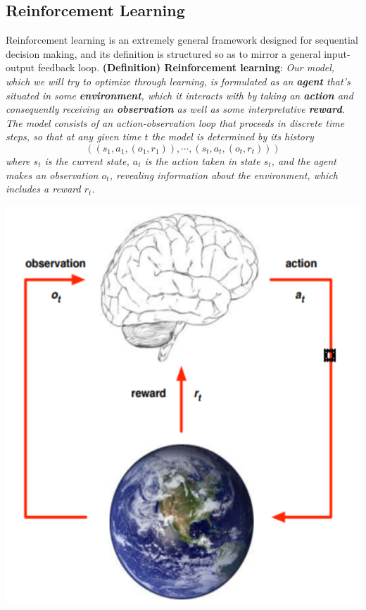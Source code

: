 \documentclass{article}
\begin{document}
\subsection{Reinforcement Learning}
Reinforcement learning is an extremely general framework designed for sequential decision making, and its definition is structured so as to mirror a general input-output feedback loop.
\newline \newline
\textbf{(Definition) Reinforcement learning}: \textit{Our model, which we will try to optimize through learning, is formulated as an \textbf{agent} that's situated in some \textbf{environment}, which it interacts with by taking an \textbf{action} and consequently receiving an \textbf{observation} as well as some interpretative \textbf{reward}. The model consists of an action-observation loop that proceeds in discrete time steps, so that at any given time $ t $ the model is determined by its history}
    $$ \left( (s_1, a_1, (o_1, r_1)), \cdots, (s_t, a_t, (o_t, r_t)) \right) $$
\indent \textit{where $ s_t $ is the current state, $ a_t $ is the action taken in state $ s_t $, and the agent makes an observation $ o_t $, revealing information about the environment, which includes a reward $ r_t $.}

\begin{center}
    \includegraphics[scale=0.3]{images/rl_diagram.png}
\end{center}
\end{document}
